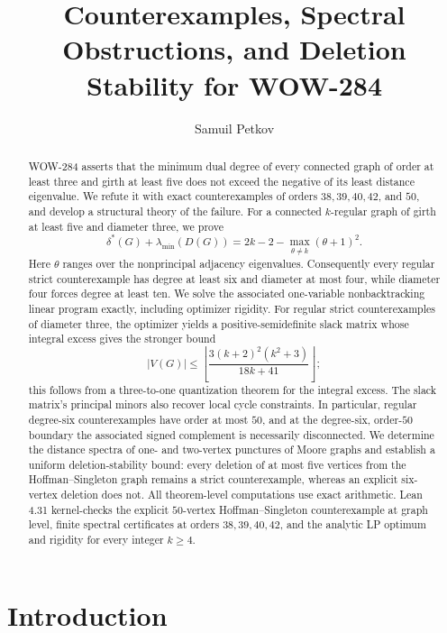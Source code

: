 \documentclass[a4paper,10pt,reqno]{amsart}
\title[Counterexamples and obstructions for WOW-284]
{Counterexamples, Spectral Obstructions, and Deletion Stability for WOW-284}
\author{Samuil Petkov}
\date{}
\theoremstyle{plain}
\theoremstyle{definition}
\theoremstyle{remark}
\begin{document}
\begin{abstract}
WOW-284 asserts that the minimum dual degree of every connected graph of
order at least three and girth at least five does not exceed the negative of
its least distance eigenvalue.  We refute it with exact counterexamples of
orders \(38,39,40,42\), and \(50\), and develop a structural theory of the
failure.  For a connected \(k\)-regular graph of girth at least five and
diameter three, we prove
\[
 \delta^*(G)+\lambda_{\min}(D(G))
 =2k-2-\max_{\theta\ne k}(\theta+1)^2.
\]
Here \(\theta\) ranges over the nonprincipal adjacency eigenvalues.
Consequently every regular strict counterexample has degree at least six and
diameter at most four, while diameter four forces degree at least ten.  We
solve the associated one-variable nonbacktracking linear program exactly,
including optimizer rigidity.  For regular strict counterexamples of diameter
three, the optimizer yields a positive-semidefinite slack matrix whose integral
excess gives the stronger bound
\[
 |V(G)|\le\left\lfloor
 \frac{3(k+2)^2(k^2+3)}{18k+41}
 \right\rfloor;
\]
this follows from a three-to-one quantization theorem for the integral excess.
The slack matrix's principal minors also recover local cycle constraints.  In
particular, regular degree-six counterexamples have order at most \(50\), and
at the degree-six, order-\(50\) boundary the associated signed complement is
necessarily disconnected.  We determine the distance spectra of one- and two-vertex
punctures of Moore graphs and establish a uniform deletion-stability bound:
every deletion of at most five vertices from the Hoffman--Singleton graph
remains a strict counterexample, whereas an explicit six-vertex deletion does
not.  All theorem-level computations use exact arithmetic.  Lean 4.31
kernel-checks the explicit \(50\)-vertex Hoffman--Singleton counterexample at
graph level, finite spectral certificates at orders \(38,39,40,42\), and the
analytic LP optimum and rigidity for every integer \(k\ge4\).
\end{abstract}

\maketitle

\section{Introduction}\label{sec:introduction}
\end{document}
